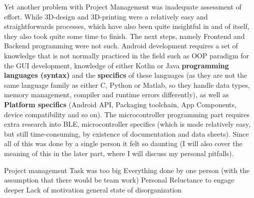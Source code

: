 Yet another problem with Project Management was inadequate assessment of effort. While 3D-design and 3D-printing were a relatively easy and straightforwards processes, which have also been quite insightful in and of itself, they also took quite some time to finish. The next steps, namely Frontend and Backend programming were not such. Android development requires a set of knowledge that is not normally practiced in the field such as \ac{OOP} paradigm for the GUI development, knowledge of either Kotlin or Java \textbf{programming languages (syntax)} and the \textbf{specifics} of these languages (as they are not the same language family as either C, Python or Matlab, so they handle data types, memory management, compiler and runtime errors differently), as well as \textbf{Platform specifics} (Android API, Packaging toolchain, App Components, device compatibility and so on). The microcontroller programming part requires extra research into \ac{BLE}, microcontroller specifics (which is made relatively easy, but still time-consuming, by existence of documentation and data sheets). Since all of this was done by a single person it felt so daunting (I will also cover the meaning of this in the later part, where I will discuss my personal pitfalls).

Project management
	Task was too big
	Everything done by one person (with the assumption that there would be team work)	
Personal
	Reluctance to engage deeper
	Lack of motivation
	general state of disorganization
